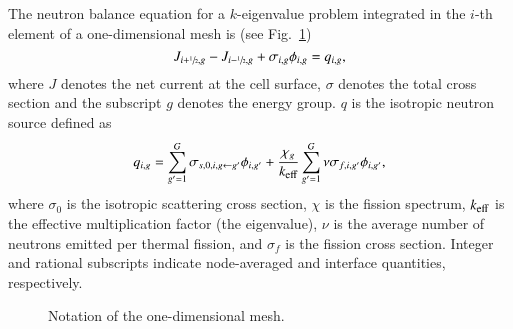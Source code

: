 The neutron balance equation for a $k$-eigenvalue problem integrated in the $i$-th element of a one-dimensional mesh is (see Fig.~\ref{fig:mesh1D})
\begin{equation}
  \label{eq:balance}
  J_{i+\sfrac{1}{2},g} - J_{i-\sfrac{1}{2},g} + \sigma_{i,g} \phi_{i,g} = q_{i,g},
\end{equation}
where $J$ denotes the net current at the cell surface, $\sigma$ denotes the total cross section and the subscript $g$ denotes the energy group. $q$ is the isotropic neutron source defined as
\begin{equation}
  \label{eq:qsrc}
  q_{i,g} = \sum\limits_{g'=1}^G\sigma_{s,0,i,g\leftarrow g'}\phi_{i,g'} +
  \frac{\chi_g}{\keff}\sum\limits_{g'=1}^G\nu\sigma_{f,i,g'}\phi_{i,g'},
\end{equation}
where $\sigma_0$ is the isotropic scattering cross section, $\chi$ is the fission spectrum, $\keff$ is the effective multiplication factor (the eigenvalue), $\nu$ is the average number of neutrons emitted per thermal fission, and $\sigma_f$ is the fission cross section. Integer and rational subscripts indicate node-averaged and interface quantities, respectively.
%
\begin{figure}[htbp]
  \centering
  
  \caption{Notation of the one-dimensional mesh.}
  \label{fig:mesh1D}
\end{figure}

